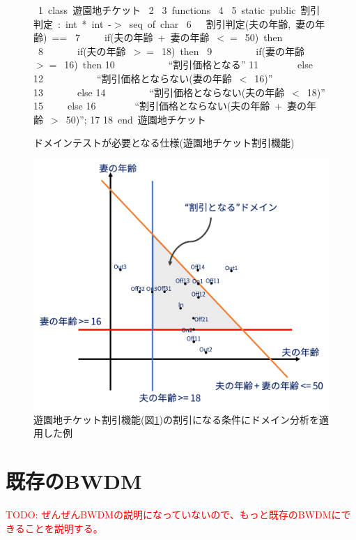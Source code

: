 \documentclass[uplatex, report, a4j, 10pt]{jsbook}
\newcommand\todo[1]{\textcolor{red}{#1}}
\newcommand{\tool}{BWDM}
\begin{document}
\begin{figure}[tb]
  \vbox{
    \hbox{ 1 class 遊園地チケット}
    \hbox{ 2}
    \hbox{ 3 functions}
    \hbox{ 4}
    \hbox{ 5 static public 割引判定 : int * int -$>$ seq of char}
    \hbox{ 6 \ \ 割引判定(夫の年齢, 妻の年齢) ==}
    \hbox{ 7 \ \ \ \ if(夫の年齢 + 妻の年齢 $<=$ 50) then}
    \hbox{ 8 \ \ \ \ \ \ if(夫の年齢 $>=$ 18) then}
    \hbox{ 9 \ \ \ \ \ \ \ \ if(妻の年齢 $>=$ 16) then}
    \hbox{10 \ \ \ \ \ \ \ \ \ \ ``割引価格となる''}
    \hbox{11 \ \ \ \ \ \ \ else}
    \hbox{12 \ \ \ \ \ \ \ \ \ \ ``割引価格とならない(妻の年齢 $<$ 16)''}
    \hbox{13 \ \ \ \ \ \ else}
    \hbox{14 \ \ \ \ \ \ \ \ ``割引価格とならない(夫の年齢 $<$ 18)''}
    \hbox{15 \ \ \ \ else}
    \hbox{16 \ \ \ \ \ \  \  ``割引価格とならない(夫の年齢 + 妻の年齢 $>$ 50)'';}
    \hbox{17}
    \hbox{18 end 遊園地チケット}
  }
  \centerline{}
  \caption{ドメインテストが必要となる仕様(遊園地チケット割引機能)}
  \label{fig:vdm_park}
\end{figure}

\begin{figure}[tp]
  \centering
  \includegraphics[keepaspectratio, width=160mm]{figs/domain_points}
  \caption{遊園地チケット割引機能(図\ref{fig:vdm_park})の割引になる条件にドメイン分析を適用した例}
  \label{fig:domain_points}
\end{figure}



\chapter{既存の\tool{}}\label{cha:Exist}
\todo{TODO: ぜんぜんBWDMの説明になっていないので、もっと既存のBWDMにできることを説明する。}
\end{document}
